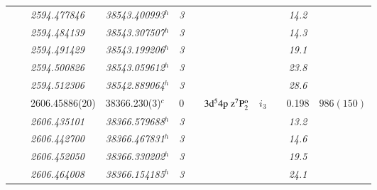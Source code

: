 \documentclass[useAMS,usenatbib]{mn2e}
\begin{document}
\begin{table*}
\begin{center}
\begin{minipage}{0.977\textwidth}
\begin{tabular}{lcllcllcccc}
              &        & \it{2594.477846}   & \it{38543.400993}$^h$    &\it{3}&                                            &                                                    &        &              &\it{14.2}& $          $\\
              &        & \it{2594.484139}   & \it{38543.307507}$^h$    &\it{3}&                                            &                                                    &        &              &\it{14.3}& $          $\\
              &        & \it{2594.491429}   & \it{38543.199206}$^h$    &\it{3}&                                            &                                                    &        &              &\it{19.1}& $          $\\
              &        & \it{2594.500826}   & \it{38543.059612}$^h$    &\it{3}&                                            &                                                    &        &              &\it{23.8}& $          $\\
              &        & \it{2594.512306}   & \it{38542.889064}$^h$    &\it{3}&                                            &                                                    &        &              &\it{28.6}& $          $\\
              &        & 2606.45886(20)     & 38366.230(3)$^c$         & 0    &                                            & $3\rm{d}^54\rm{p~z}^7\rm{P}_2^{\rm{o}}$            & $i_3$  &              &  0.198  & $  986(150)$\\
              &        & \it{2606.435101}   & \it{38366.579688}$^h$    &\it{3}&                                            &                                                    &        &              &\it{13.2}& $          $\\
              &        & \it{2606.442700}   & \it{38366.467831}$^h$    &\it{3}&                                            &                                                    &        &              &\it{14.6}& $          $\\
              &        & \it{2606.452050}   & \it{38366.330202}$^h$    &\it{3}&                                            &                                                    &        &              &\it{19.5}& $          $\\
              &        & \it{2606.464008}   & \it{38366.154185}$^h$    &\it{3}&                                            &                                                    &        &              &\it{24.1}& $          $\\

\end{tabular}
\end{minipage}
\end{center}
\end{table*}
\end{document}
